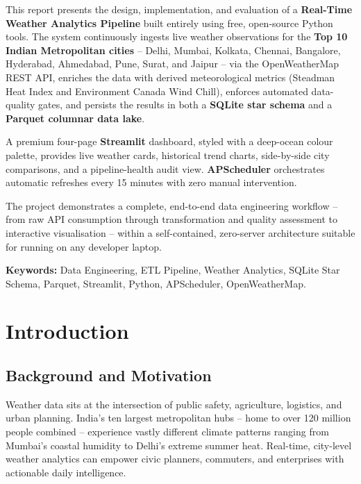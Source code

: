 \documentclass[12pt,a4paper]{report}
\begin{document}
This report presents the design, implementation, and evaluation of a \textbf{Real-Time Weather Analytics Pipeline} built entirely using free, open-source Python tools. The system continuously ingests live weather observations for the \textbf{Top 10 Indian Metropolitan cities} -- Delhi, Mumbai, Kolkata, Chennai, Bangalore, Hyderabad, Ahmedabad, Pune, Surat, and Jaipur -- via the OpenWeatherMap REST API, enriches the data with derived meteorological metrics (Steadman Heat Index and Environment Canada Wind Chill), enforces automated data-quality gates, and persists the results in both a \textbf{SQLite star schema} and a \textbf{Parquet columnar data lake}.

A premium four-page \textbf{Streamlit} dashboard, styled with a deep-ocean colour palette, provides live weather cards, historical trend charts, side-by-side city comparisons, and a pipeline-health audit view. \textbf{APScheduler} orchestrates automatic refreshes every 15 minutes with zero manual intervention.

The project demonstrates a complete, end-to-end data engineering workflow -- from raw API consumption through transformation and quality assessment to interactive visualisation -- within a self-contained, zero-server architecture suitable for running on any developer laptop.

\textbf{Keywords:} Data Engineering, ETL Pipeline, Weather Analytics, SQLite Star Schema, Parquet, Streamlit, Python, APScheduler, OpenWeatherMap.

\tableofcontents
\listoftables

\chapter{Introduction}

\section{Background and Motivation}

Weather data sits at the intersection of public safety, agriculture, logistics, and urban planning. India's ten largest metropolitan hubs -- home to over 120 million people combined -- experience vastly different climate patterns ranging from Mumbai's coastal humidity to Delhi's extreme summer heat. Real-time, city-level weather analytics can empower civic planners, commuters, and enterprises with actionable daily intelligence.
\end{document}
